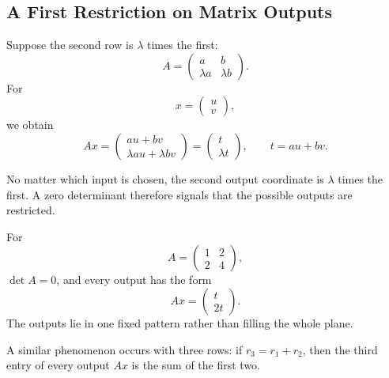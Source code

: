 \subsection{A First Restriction on Matrix Outputs}

Suppose the second row is $\lambda$ times the first:
\[
A=\begin{pmatrix}a&b\\\lambda a&\lambda b\end{pmatrix}.
\]
For
\[
x=\begin{pmatrix}u\\v\end{pmatrix},
\]
we obtain
\[
Ax=
\begin{pmatrix}au+bv\\\lambda au+\lambda bv\end{pmatrix}
=
\begin{pmatrix}t\\\lambda t\end{pmatrix},
\qquad t=au+bv.
\]

\begin{interpretationbox}
No matter which input is chosen, the second output coordinate is $\lambda$ times the first. A zero determinant therefore signals that the possible outputs are restricted.
\end{interpretationbox}

\begin{examplebox}
For
\[
A=\begin{pmatrix}1&2\\2&4\end{pmatrix},
\]
$\det A=0$, and every output has the form
\[
Ax=\begin{pmatrix}t\\2t\end{pmatrix}.
\]
The outputs lie in one fixed pattern rather than filling the whole plane.
\end{examplebox}

A similar phenomenon occurs with three rows: if $r_3=r_1+r_2$, then the third entry of every output $Ax$ is the sum of the first two.
